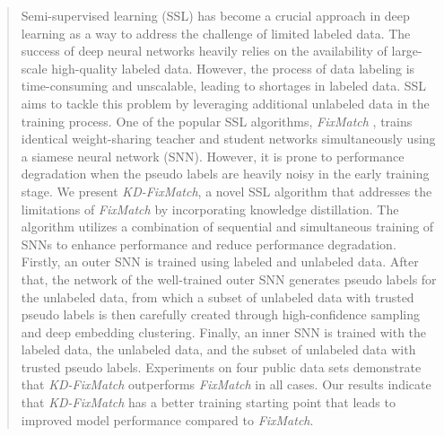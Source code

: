 \documentclass{article}
\begin{document}
\begin{abstract}
	Semi-supervised learning (SSL) has become a crucial approach in deep learning as a way to address the challenge of limited labeled data.
    The success of deep neural networks heavily relies on the availability of large-scale high-quality labeled data.
    However, the process of data labeling is time-consuming and unscalable, leading to shortages in labeled data.
    SSL aims to tackle this problem by leveraging additional unlabeled data in the training process.
    One of the popular SSL algorithms, {\sl FixMatch} \cite{KS20a}, trains identical weight-sharing teacher and student networks simultaneously using a siamese neural network (SNN).
    However, it is prone to performance degradation when the pseudo labels are heavily noisy in the early training stage.
    We present {\sl KD-FixMatch}, a novel SSL algorithm that addresses the limitations of {\sl FixMatch} by incorporating knowledge distillation.
    The algorithm utilizes a combination of sequential and simultaneous training of SNNs to enhance performance and reduce performance degradation.
    Firstly, an outer SNN is trained using labeled and unlabeled data. After that, the network of the well-trained outer SNN generates pseudo labels for the unlabeled data, from which
    a subset of unlabeled data with trusted pseudo labels is then carefully created through high-confidence sampling and deep embedding clustering.
    Finally, an inner SNN is trained with the labeled data, the unlabeled data, and the subset of unlabeled data with trusted pseudo labels.
	Experiments on four public data sets demonstrate that {\sl KD-FixMatch} outperforms {\sl FixMatch} in all cases.
	Our results indicate that {\sl KD-FixMatch} has a better training starting point that leads to improved model performance compared to {\sl FixMatch}.
\end{abstract}
\end{document}

